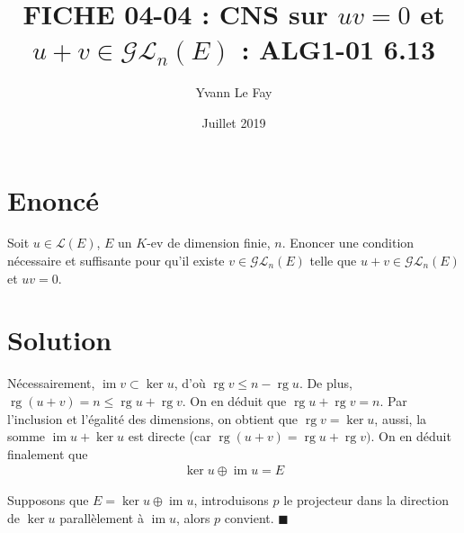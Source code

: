 \documentclass{article}
\newcommand*{\QED}{\hfill\ensuremath{\blacksquare}}%
\DeclareMathOperator{\im}{im}
\DeclareMathOperator{\rg}{rg}
\begin{document}
\title{FICHE 04-04 : CNS sur $uv = 0$ et $u+v\in\mathcal{G}\mathcal{L}_n(E)$ : ALG1-01 6.13}
\author{Yvann Le Fay}
\date{Juillet 2019}
\maketitle
\section*{Enoncé}
Soit $u\in\mathcal{L}(E)$, $E$ un $K$-ev de dimension finie, $n$. Enoncer une condition nécessaire et suffisante pour qu'il existe $v\in\mathcal{G}\mathcal{L}_n(E)$ telle que $u+v\in\mathcal{G}\mathcal{L}_n(E)$ et $uv = 0$.
\section*{Solution}
Nécessairement, $\im v \subset \ker u$, d'où $\rg v\leq n-\rg u$. De plus, $\rg (u+v)= n \leq \rg u + \rg v$. On en déduit que $\rg u +\rg v = n$. Par l'inclusion et l'égalité des dimensions, on obtient que $\rg v = \ker u$, aussi, la somme $\im u+\ker u$ est directe (car $\rg (u+v)=\rg u + \rg v)$. On en déduit finalement que 
\begin{align*}
\ker u \oplus \im u = E
\end{align*}

Supposons que $E = \ker u \oplus \im u$, introduisons $p$ le projecteur dans la direction de $\ker u$ parallèlement à $\im u$, alors $p$ convient. 
\QED
\end{document}
